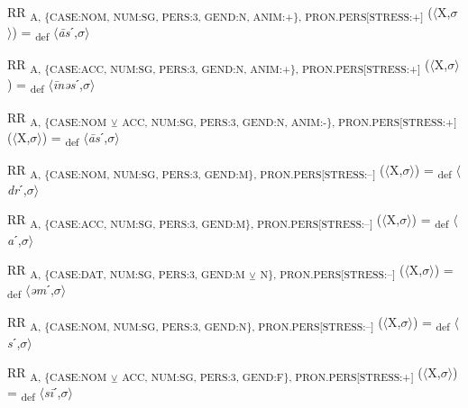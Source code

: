{\begin{exe}
 RR \textsubscript{A, \{CASE:NOM, NUM:SG, PERS:3, GEND:N, ANIM:+\}, PRON.PERS[STRESS:+]} ($\langle$X,$\sigma $$\rangle$) = \textsubscript{def} $\langle$\textit{\=as}ˊ,$\sigma $$\rangle$
\end{exe}

\begin{exe}
 RR \textsubscript{A, \{CASE:ACC, NUM:SG, PERS:3, GEND:N, ANIM:+\}, PRON.PERS[STRESS:+]} ($\langle$X,$\sigma $$\rangle$) = \textsubscript{def} $\langle$\textit{\=inəs}ˊ,$\sigma $$\rangle$
\end{exe}

\begin{exe}
 RR \textsubscript{A, \{CASE:NOM} \textsubscript{${\veebar}$}\textsubscript{ ACC, NUM:SG, PERS:3, GEND:N, ANIM:-\}, PRON.PERS[STRESS:+]} ($\langle$X,$\sigma $$\rangle$) = \textsubscript{def} $\langle$\textit{\=as}ˊ,$\sigma $$\rangle$
\end{exe}

\begin{exe}
 RR \textsubscript{A, \{CASE:NOM, NUM:SG, PERS:3, GEND:M\}, PRON.PERS[STRESS:–]} ($\langle$X,$\sigma $$\rangle$) = \textsubscript{def} $\langle$\textit{dr}ˊ,$\sigma $$\rangle$
\end{exe}

\begin{exe}
 RR \textsubscript{A, \{CASE:ACC, NUM:SG, PERS:3, GEND:M\}, PRON.PERS[STRESS:–]} ($\langle$X,$\sigma $$\rangle$) = \textsubscript{def} $\langle$\textit{a}ˊ,$\sigma $$\rangle$
\end{exe}

\begin{exe}
 RR \textsubscript{A, \{CASE:DAT, NUM:SG, PERS:3, GEND:M} \textsubscript{${\veebar}$}\textsubscript{ N\}, PRON.PERS[STRESS:–]} ($\langle$X,$\sigma $$\rangle$) = \textsubscript{def} $\langle$\textit{əm}ˊ,$\sigma $$\rangle$
\end{exe}

\begin{exe}
 RR \textsubscript{A, \{CASE:NOM, NUM:SG, PERS:3, GEND:N\}, PRON.PERS[STRESS:–]} ($\langle$X,$\sigma $$\rangle$) = \textsubscript{def} $\langle$\textit{s}ˊ,$\sigma $$\rangle$
\end{exe}

\begin{exe}
 RR \textsubscript{A, \{CASE:NOM} \textsubscript{${\veebar}$}\textsubscript{ ACC, NUM:SG, PERS:3, GEND:F\}, PRON.PERS[STRESS:+]} ($\langle$X,$\sigma $$\rangle$) = \textsubscript{def} $\langle$\textit{s\=i}ˊ,$\sigma $$\rangle$
\end{exe}

}

